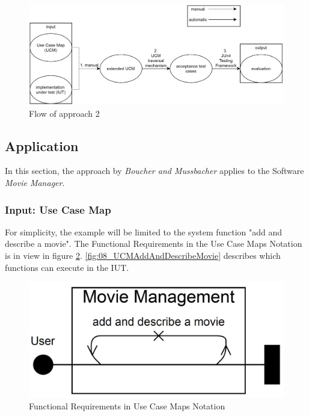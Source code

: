 \begin{figure}[h]
	\centering
	\includegraphics[scale=0.4]{../images/08/08_controllFlow2.jpg} 
	\caption{Flow of approach 2}
	\label{fig:08_flowOf2}
\end{figure}
\subsection{Application}

In this section, the approach by \textit{Boucher and Mussbacher} applies to the Software \textit{Movie Manager}.

\subsubsection{Input: Use Case Map}

For simplicity, the example will be limited to the system function "add and describe a movie". The Functional Requirements in the Use Case Maps Notation is in view in figure \ref{fig:08_UCMAddAndDescribeMovie}. \autoref{fig:08_UCMAddAndDescribeMovie} describes which functions can execute in the IUT.

\begin{figure}[h]
	\centering
	\includegraphics[scale=0.3]{../images/08/08_UCMAddAndDescribeMovie.jpg} 
	\caption{Functional Requirements in Use Case Maps Notation}
	\label{fig:08_UCMAddAndDescribeMovie}
\end{figure}
\newpage
